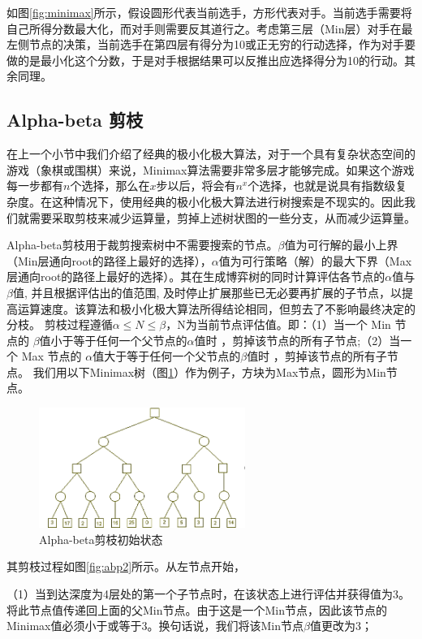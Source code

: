 如图\ref{fig:minimax}所示，假设圆形代表当前选手，方形代表对手。当前选手需要将自己所得分数最大化，而对手则需要反其道行之。考虑第三层（Min层）对手在最左侧节点的决策，当前选手在第四层有得分为10或正无穷的行动选择，作为对手要做的是最小化这个分数，于是对手根据结果可以反推出应选择得分为10的行动。其余同理。
\subsection{Alpha-beta 剪枝}
在上一个小节中我们介绍了经典的极小化极大算法，对于一个具有复杂状态空间的游戏（象棋或围棋）来说，Minimax算法需要非常多层才能够完成。如果这个游戏每一步都有$n$个选择，那么在$x$步以后，将会有$n^x$个选择，也就是说具有指数级复杂度。在这种情况下，使用经典的极小化极大算法进行树搜索是不现实的。因此我们就需要采取剪枝来减少运算量，剪掉上述树状图的一些分支，从而减少运算量。

Alpha-beta剪枝用于裁剪搜索树中不需要搜索的节点。$\beta$值为可行解的最小上界（Min层通向root的路径上最好的选择），$\alpha$值为可行策略（解）的最大下界（Max层通向root的路径上最好的选择）。其在生成博弈树的同时计算评估各节点的$\alpha$值与$\beta$值, 并且根据评估出的值范围, 及时停止扩展那些已无必要再扩展的子节点，以提高运算速度。该算法和极小化极大算法所得结论相同，但剪去了不影响最终决定的分枝\cite{russell2010artificial}。
剪枝过程遵循$\alpha \le N \le \beta$，N为当前节点评估值。即：（1）当一个 Min 节点的 $\beta$值小于等于任何一个父节点的$\alpha$值时 ，剪掉该节点的所有子节点;（2）当一个 Max 节点的 $\alpha$值大于等于任何一个父节点的$\beta$值时 ，剪掉该节点的所有子节点。
我们用以下Minimax树（图\ref{fig:abp}）作为例子，方块为Max节点，圆形为Min节点\cite{russell2010artificial}。
\begin{figure}[htb]
    \centering
    \includegraphics[width=0.6\textwidth]{abp1.PNG}
    \caption[abp]{%
    Alpha-beta剪枝初始状态\cite{russell2010artificial}%
      }
    \label{fig:abp}
  \end{figure}

其剪枝过程如图\ref{fig:abp2}所示。从左节点开始，

（1）当到达深度为4层处的第一个子节点时，在该状态上进行评估并获得值为3。将此节点值传递回上面的父Min节点。由于这是一个Min节点，因此该节点的Minimax值必须小于或等于3。换句话说，我们将该Min节点$\beta$值更改为3；

